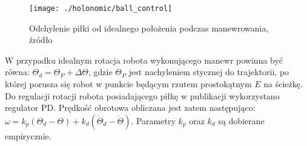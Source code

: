 \begin{figure}[h]
\centering
\texttt{[image: ./holonomic/ball\_control]}
\caption{ Odchylenie piłki od idealnego położenia podczas manewrowania, źródło \cite{dribbling} }\label{fig:ball_control}
\end{figure}
W przypadku idealnym rotacja robota wykonującego manewr powinna być równa: $\Theta_{d}=\Theta_{P} + \Delta\Theta$, gdzie $\Theta_{P}$ jest nachyleniem stycznej do trajektorii, po której porusza się robot w punkcie
będącym rzutem prostokątnym $E$ na ścieżkę.  Do regulacji rotacji robota posiadającego piłkę w publikacji \cite{dribbling}
wykorzystano regulator PD. Prędkość obrotowa obliczana jest zatem następująco: $\omega=k_p(\Theta_d -\Theta) +k_d(\dot{\Theta}_d -\dot{\Theta} )$. Parametry $k_p$ oraz $k_d$ są dobierane empirycznie.

